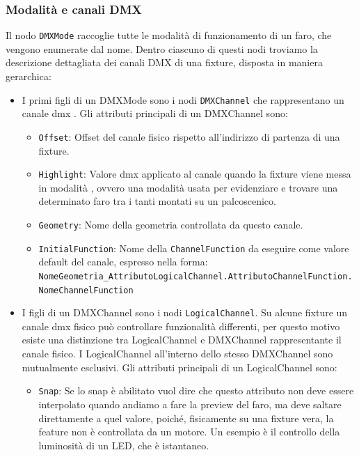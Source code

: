 \documentclass[main.tex]{subfiles}
\begin{document}
\subsubsection{Modalità e canali DMX}\label{subsec:1_2_dmxchannels}
Il nodo \lstinline{DMXMode} raccoglie tutte le modalità di funzionamento di un faro, che vengono enumerate dal nome. Dentro ciascuno di questi nodi troviamo la descrizione dettagliata dei canali DMX di una fixture, disposta in maniera gerarchica:
\begin{itemize}
    \item I primi figli di un DMXMode sono i nodi \lstinline{DMXChannel} che rappresentano un canale dmx . Gli attributi principali di un DMXChannel sono: \begin{itemize}
            \item \lstinline{Offset}: Offset del canale fisico rispetto all'indirizzo di partenza di una fixture.
            \item \lstinline{Highlight}: Valore dmx applicato al canale quando la fixture viene messa in modalità , ovvero una modalità usata per evidenziare e trovare una determinato faro tra i tanti montati su un palcoscenico.
            \item \lstinline{Geometry}: Nome della geometria controllata da questo canale.
            \item \lstinline{InitialFunction}: Nome della \lstinline{ChannelFunction} da eseguire come valore default del canale, espresso nella forma: \lstinline{NomeGeometria_AttributoLogicalChannel.AttributoChannelFunction.NomeChannelFunction}
        \end{itemize}
    \item I figli di un DMXChannel sono i nodi \lstinline{LogicalChannel}. Su alcune fixture un canale dmx fisico può controllare funzionalità differenti, per questo motivo esiste una distinzione tra LogicalChannel e DMXChannel rappresentante il canale fisico. I LogicalChannel all'interno dello stesso DMXChannel sono mutualmente esclusivi. Gli attributi principali di un LogicalChannel sono: \begin{itemize}
            \item \lstinline{Snap}: Se lo snap è abilitato vuol dire che questo attributo non deve essere interpolato quando andiamo a fare la preview del faro, ma deve saltare direttamente a quel valore, poiché, fisicamente su una fixture vera, la feature non è controllata da un motore. Un esempio è il controllo della luminosità di un LED, che è istantaneo.

\end{itemize}
\end{itemize}
\end{document}
